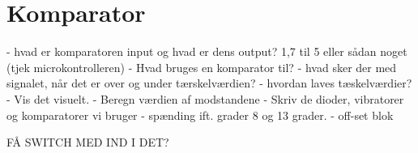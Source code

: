 \section{Komparator}
- hvad er komparatoren input og hvad er dens output? 1,7 til 5 eller sådan noget (tjek microkontrolleren)
- Hvad bruges en komparator til?
- hvad sker der med signalet, når det er over og under tærskelværdien? 
- hvordan laves tæskelværdier?
- Vis det visuelt. 
- Beregn værdien af modstandene
- Skriv de dioder, vibratorer og komparatorer vi bruger 
- spænding ift. grader 8 og 13 grader. 
- off-set blok 


FÅ SWITCH MED IND I DET? 